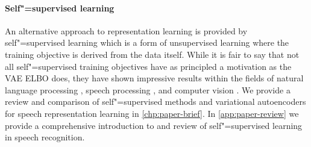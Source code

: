\paragraph{Self"=supervised learning}
An alternative approach to representation learning is provided by self"=supervised learning \parencite{mikolov_efficient_2013,devlin_bert_2018,chen_simple_2020,schneider_wav2vec_2019} which is a form of unsupervised learning where the training objective is derived from the data itself. 
While it is fair to say that not all self"=supervised training objectives have as principled a motivation as the VAE ELBO does, they have shown impressive results within the fields of natural language processing \parencite{devlin_bert_2018,chen_simple_2020}, speech processing \parencite{schneider_wav2vec_2019}, and computer vision \parencite{chen_simple_2020}. 
We provide a review and comparison of self"=supervised methods and variational autoencoders for speech representation learning in \cref{chp:paper-brief}. 
In \cref{app:paper-review} we provide a comprehensive introduction to and review of self"=supervised learning in speech recognition. 
